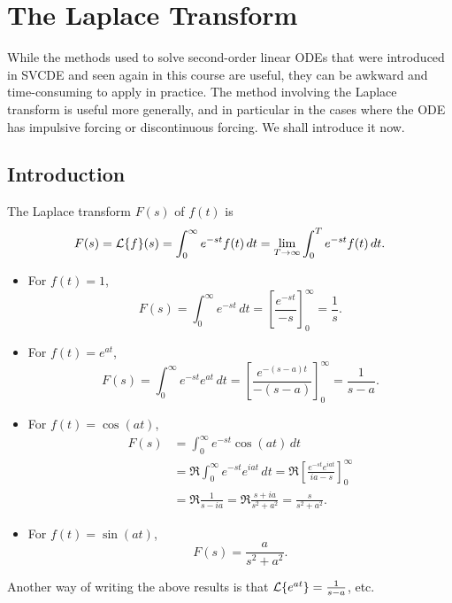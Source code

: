 \section{The Laplace Transform}

While the methods used to solve second-order linear ODEs that were introduced in SVCDE and seen again in this course are useful, they can be awkward and time-consuming to apply in practice. The method involving the Laplace transform is useful more generally, and in particular in the cases where the ODE has impulsive forcing or discontinuous forcing. We shall introduce it now.

\subsection{Introduction}

\begin{definition}
	The Laplace transform $F(s)$ of $f(t)$ is
	\begin{equation}
		F(s) = \mathcal{L}\{f\}(s) = \int_0^{\infty} e^{-st}f(t)\,dt = \lim_{T \to \infty} \int_0^T e^{-st}f(t)\,dt.
	\end{equation}
\end{definition}

\begin{eg}\label{eg:laplacetrans}\hfill
	\begin{itemize}
		\item For $f(t)=1$,
		\[
		F(s) = \int_0^{\infty} e^{-st}\,dt = \left[\frac{e^{-st}}{-s}\right]_0^{\infty} = \frac{1}{s}.
		\]
		\item For $f(t)=e^{at}$,
		\[
		F(s) = \int_0^{\infty} e^{-st}e^{at}\,dt = \left[\frac{e^{-(s-a)t}}{-(s-a)}\right]_0^{\infty} = \frac{1}{s-a}. \tag{$s>a$}
		\]
		\item For $f(t) = \cos(at)$,
		\begin{align*}
			F(s) &= \int_0^{\infty} e^{-st}\cos(at)\,dt \tag{$s>0$} \\
			&= \Re \int_0^{\infty} e^{-st}e^{iat} \,dt = \Re \left[\frac{e^{-st}e^{iat}}{ia-s}\right]_0^{\infty} \\
			&= \Re \frac{1}{s-ia} = \Re \frac{s+ia}{s^2+a^2} = \frac{s}{s^2+a^2}.
		\end{align*}
		\item For $f(t) = \sin(at)$,
		\[
		F(s) = \frac{a}{s^2+a^2}.
		\]
	\end{itemize}
\end{eg}

Another way of writing the above results is that $\mathcal{L}\{e^{at}\} = \frac{1}{s-a}$, etc.

